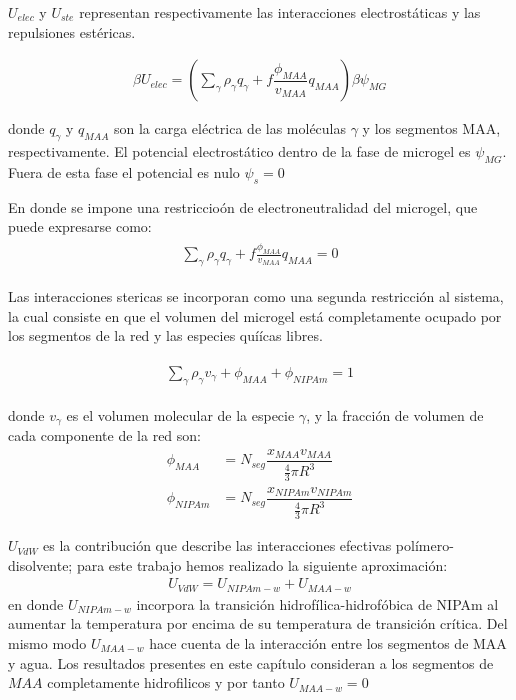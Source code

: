 $U_{elec}$ y $U_{ste}$ representan respectivamente las interacciones electrost\'aticas y las repulsiones est\'ericas.

\begin{align}
	  \beta U_{elec} =\left(\sum_{\gamma } {\rho_\gamma q_\gamma + f\dfrac{\phi_{MAA}}{v_{MAA}}q_{MAA}}\right)\beta\psi_{MG}
\end{align}

\noindent donde $q_\gamma$ y $q_{MAA}$ son la carga el\'ectrica de las moléculas $\gamma$ y los segmentos MAA, respectivamente.
El potencial electrost\'atico dentro de la fase de microgel es $\psi_{MG}$. Fuera de esta fase el potencial es nulo $\psi_s = 0$

En donde se impone una restriccio\'on de electroneutralidad del microgel, que puede expresarse como:
%
%
\begin{align}
	\begin{aligned}
		\sum_{\gamma  } \rho_\gamma q_\gamma + f\frac{\phi_{MAA}}{v_{MAA}}q_{MAA}=0
	\end{aligned}
	\label{eq:gel:charge-neutrality}
\end{align}

Las interacciones stericas se incorporan como una segunda restricci\'on al sistema, la cual consiste en que  el volumen del microgel est\'a completamente ocupado por los segmentos de la red y las especies quí\'icas libres.

%
\begin{align}
	\begin{aligned}
		\sum_{\gamma } \rho_\gamma v_\gamma  + \phi_{MAA} + \phi_{NIPAm} = 1
	\end{aligned}
	\label{eq:gel:packing}
\end{align}



\noindent donde $v_\gamma$  es el volumen molecular de la especie $\gamma$, y la fracci\'on de volumen de cada componente de la red son: 
%
%
\begin{align}
	\phi_{MAA}&=N_{seg}\dfrac{x_{MAA}v_{MAA}}{\frac{4}{3}\pi R^3}\\
	\phi_{NIPAm}&=N_{seg}\dfrac{x_{NIPAm}v_{NIPAm}}{\frac{4}{3}\pi R^3}
\end{align}



$U_{VdW}$ es la contribuci\'on que describe las interacciones efectivas pol\'imero-disolvente; para este trabajo hemos realizado la siguiente aproximaci\'on: 
\begin{align}
	U_{VdW} = U_{NIPAm-w} + U_{MAA-w}
\end{align}
\noindent en donde $U_{NIPAm-w}$ incorpora la transici\'on hidrofílica-hidrof\'obica de NIPAm al aumentar la temperatura por encima de su temperatura de transici\'on cr\'itica. 
Del mismo modo $U_{MAA-w}$ hace cuenta de la interacci\'on entre los segmentos de MAA y agua.
Los resultados presentes en este cap\'itulo consideran a los segmentos de $MAA$ completamente hidrofilicos y por tanto $U_{MAA-w} = 0$

